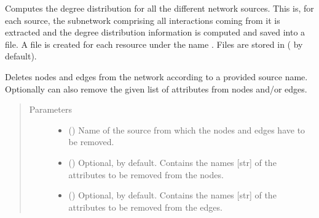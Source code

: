 \documentclass[letterpaper,10pt,english]{sphinxmanual}
\begin{document}
\begin{fulllineitems}
\begin{fulllineitems}
\end{fulllineitems}


\begin{fulllineitems}
\label{\detokenize{main:pypath.main.PyPath.degree_dists}}
Computes the degree distribution for all the different network
sources. This is, for each source, the subnetwork comprising all
interactions coming from it is extracted and the degree
distribution information is computed and saved into a file.
A file is created for each resource under the name
. Files are stored in
 ( by default).

\end{fulllineitems}


\begin{fulllineitems}
\label{\detokenize{main:pypath.main.PyPath.delete_by_source}}
Deletes nodes and edges from the network according to a provided
source name. Optionally can also remove the given list of
attributes from nodes and/or edges.
\begin{quote}\begin{description}
\item[{Parameters}] \leavevmode\begin{itemize}
\item {} 
 () \textendash{} Name of the source from which the nodes and edges have to be
removed.

\item {} 
 () \textendash{} Optional,  by default. Contains the names {[}str{]} of
the attributes to be removed from the nodes.

\item {} 
 () \textendash{} Optional,  by default. Contains the names {[}str{]} of
the attributes to be removed from the edges.


\end{itemize}
\end{description}
\end{quote}
\end{fulllineitems}
\end{fulllineitems}
\end{document}
